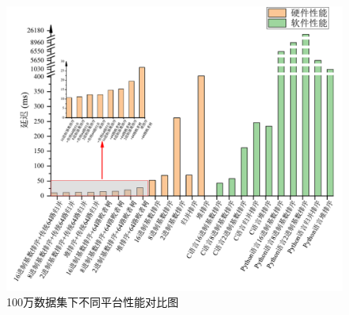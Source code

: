 \begin{figure}[htbp]
    \centering
    \includegraphics[width=\linewidth]{figures/1MComparison.pdf}
    \caption{100万数据集下不同平台性能对比图}
    \label{fig:1MComparison}
\end{figure}


\begin{table}[htbp]
\centering
\caption{100万级别数据集软件性能测试}
\label{tab:1Msoftware}
\end{table}



